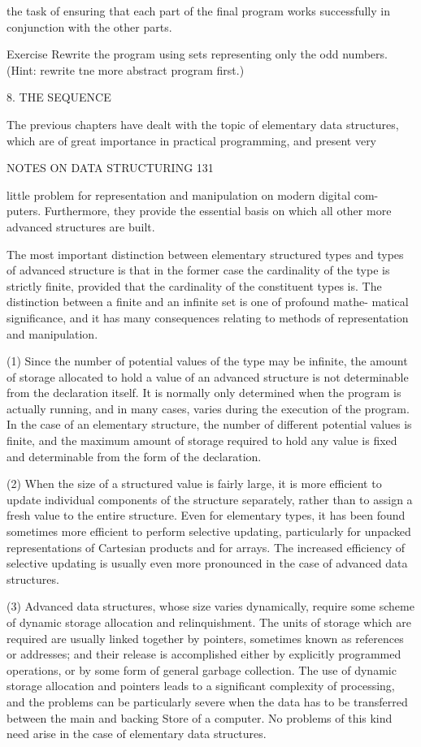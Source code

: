 {{{{				the task of ensuring that each part of the final program works successfully in conjunction with the other parts.
				
				Exercise Rewrite the program using sets representing only the odd numbers. (Hint: rewrite tne more abstract program first.)
				
				8. THE SEQUENCE
				
				The previous chapters have dealt with the topic of elementary data structures, which are of great importance in practical programming, and present very
				
				NOTES ON DATA STRUCTURING 131
				
				little problem for representation and manipulation on modern digital com- puters. Furthermore, they provide the essential basis on which all other more advanced structures are built.
				
				The most important distinction between elementary structured types and types of advanced structure is that in the former case the cardinality of the type is strictly finite, provided that the cardinality of the constituent types is. The distinction between a finite and an infinite set is one of profound mathe- matical significance, and it has many consequences relating to methods of representation and manipulation.
				
				(1) Since the number of potential values of the type may be infinite, the amount of storage allocated to hold a value of an advanced structure is not determinable from the declaration itself. It is normally only determined when the program is actually running, and in many cases, varies during the execution of the program. In the case of an elementary structure, the number of different potential values is finite, and the maximum amount of storage required to hold any value is fixed and determinable from the form of the declaration.
				
				(2) When the size of a structured value is fairly large, it is more efficient to update individual components of the structure separately, rather than to assign a fresh value to the entire structure. Even for elementary types, it has been found sometimes more efficient to perform selective updating, particularly for unpacked representations of Cartesian products and for arrays. The increased efficiency of selective updating is usually even more pronounced in the case of advanced data structures.
				
				(3) Advanced data structures, whose size varies dynamically, require some scheme of dynamic storage allocation and relinquishment. The units of storage which are required are usually linked together by pointers, sometimes known as references or addresses; and their release is accomplished either by explicitly programmed operations, or by some form of general garbage collection. The use of dynamic storage allocation and pointers leads to a significant complexity of processing, and the problems can be particularly severe when the data has to be transferred between the main and backing Store of a computer. No problems of this kind need arise in the case of elementary data structures.
				
}}}}
